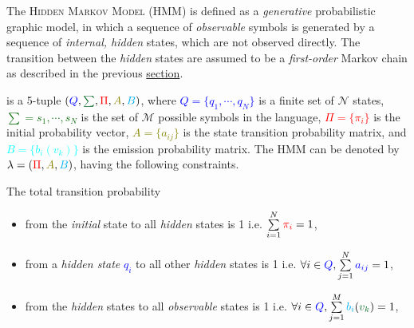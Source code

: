 The \textsc{Hidden Markov Model} (HMM) is defined as a \textit{generative} probabilistic graphic model, in which a sequence of \textit{observable} symbols is generated by a sequence of \textit{internal, hidden} states, which are not observed directly. The transition between the \textit{hidden} states are assumed to be a \textit{first-order} Markov chain as described in the previous \hyperref[markov]{section}.

\begin{frm-def}
\textup{is a 5-tuple $(\textcolor{blue}{Q}, \textcolor{darkgreen}{\sum}, \textcolor{red}{\Pi}, \textcolor{olive}{A}, \textcolor{cyan}{B})$, where \textcolor{blue}{$Q = \{q_{1}, \cdots, q_{N}\}$} is a finite set of $\mathcal{N}$ states, \textcolor{darkgreen}{$\sum = {s_1, \cdots, s_{N}}$} is the set of $\mathcal{M}$ possible symbols in the language, \textcolor{red}{$\Pi = \{\pi_{i}\}$}  is the initial probability vector, \textcolor{olive}{$A = \{a_{ij}\}$} is the state transition probability matrix, and \textcolor{cyan}{$B = \{b_i(v_k)\}$} is the emission probability matrix. The HMM can be denoted by $\lambda = (\textcolor{red}{\Pi}, \textcolor{olive}{A},\textcolor{cyan}{B})$, having the following constraints.}\\

\vspace{-2mm}

The total transition probability \cite{zhai2003brief, 1165342}

\begin{itemize}
\setlength\itemsep{-2mm}
  \item{\textup{from the  \textit{initial} state to all \textit{hidden} states is 1 i.e. $\sum\limits_{i = 1}^{N} \textcolor{red}{\pi_i} = 1$,}}
  \item{\textup{from a \textit{hidden state} \textcolor{blue}{$q_i$} to all other \textit{hidden} states is 1 i.e. $\forall i \in \textcolor{blue}{Q},  \sum\limits_{j = 1}^{N} \textcolor{blue}{a_{ij}} = 1$,}}
  \item{\textup{from the \textit{hidden} states to all \textit{observable} states is 1 i.e. $\forall i \in \textcolor{blue}{Q}, \sum\limits_{j = 1}^{M} \textcolor{cyan}{b_i}(\textcolor{darkgreen}{v_{k}}) = 1$,}}
\end{itemize}

\end{frm-def}


